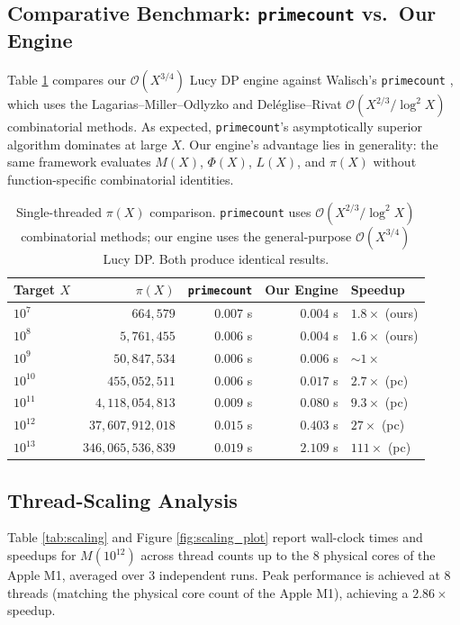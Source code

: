\documentclass[11pt,a4paper]{article}
\theoremstyle{plain}
\theoremstyle{definition}
\newcommand{\Oh}{\mathcal{O}}
\begin{document}
\subsection{Comparative Benchmark: \texttt{primecount} vs.\ Our Engine}
Table \ref{tab:comparison} compares our $\Oh(X^{3/4})$ Lucy DP engine against Walisch's \texttt{primecount} \cite{walisch2024primecount}, which uses the Lagarias--Miller--Odlyzko and Del{\'e}glise--Rivat $\Oh(X^{2/3}/\log^2 X)$ combinatorial methods. As expected, \texttt{primecount}'s asymptotically superior algorithm dominates at large $X$. Our engine's advantage lies in generality: the same framework evaluates $M(X)$, $\Phi(X)$, $L(X)$, and $\pi(X)$ without function-specific combinatorial identities.

\begin{table}[htbp]
\centering
\small
\begin{tabular}{@{}lrrrl@{}}
\toprule
\textbf{Target $X$} & \textbf{$\pi(X)$} & \textbf{\texttt{primecount}} & \textbf{Our Engine} & \textbf{Speedup} \\
\midrule
$10^{7}$  & $664{,}579$       & $0.007$ s & $0.004$ s  & $1.8\times$ (ours) \\
$10^{8}$  & $5{,}761{,}455$   & $0.006$ s & $0.004$ s  & $1.6\times$ (ours) \\
$10^{9}$  & $50{,}847{,}534$  & $0.006$ s & $0.006$ s  & $\sim 1\times$ \\
$10^{10}$ & $455{,}052{,}511$ & $0.006$ s & $0.017$ s  & $2.7\times$ (pc) \\
$10^{11}$ & $4{,}118{,}054{,}813$ & $0.009$ s & $0.080$ s & $9.3\times$ (pc) \\
$10^{12}$ & $37{,}607{,}912{,}018$ & $0.015$ s & $0.403$ s & $27\times$ (pc) \\
$10^{13}$ & $346{,}065{,}536{,}839$ & $0.019$ s & $2.109$ s & $111\times$ (pc) \\
\bottomrule
\end{tabular}
\caption{Single-threaded $\pi(X)$ comparison. \texttt{primecount} uses $\Oh(X^{2/3}/\log^2 X)$ combinatorial methods; our engine uses the general-purpose $\Oh(X^{3/4})$ Lucy DP. Both produce identical results.}
\label{tab:comparison}
\end{table}

\subsection{Thread-Scaling Analysis}
Table \ref{tab:scaling} and Figure \ref{fig:scaling_plot} report wall-clock times and speedups for $M(10^{12})$ across thread counts up to the $8$ physical cores of the Apple M1, averaged over $3$ independent runs. Peak performance is achieved at $8$ threads (matching the physical core count of the Apple M1), achieving a $2.86\times$ speedup.
\end{document}
